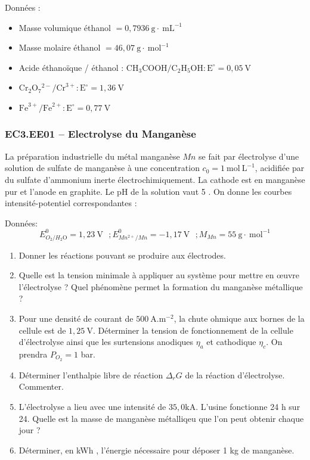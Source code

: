 Données :
\begin{itemize}
\item Masse volumique éthanol $=0,7936 \mathrm{~g} \cdot \mathrm{~mL}^{-1}$
\item Masse molaire éthanol $=46,07 \mathrm{~g} \cdot \mathrm{~mol}^{-1}$
\item Acide éthanoïque / éthanol : $\mathrm{CH}_3 \mathrm{COOH} / \mathrm{C}_2 \mathrm{H}_5 \mathrm{OH}: \mathrm{E}^{\circ}=0,05 \mathrm{~V}$
\item $\mathrm{Cr}_2 \mathrm{O}_7{ }^{2-} / \mathrm{Cr}^{3+}: \mathrm{E}^{\circ}=1,36 \mathrm{~V}$
\item $\mathrm{Fe}^{3+} / \mathrm{Fe}^{2+}: \mathrm{E}^{\circ}=0,77 \mathrm{~V}$

\end{itemize}

\newpage
\subsubsection*{EC3.EE01 -- Electrolyse du Manganèse  \corrige}

La préparation industrielle du métal manganèse $M n$ se fait par électrolyse d'une solution de sulfate de manganèse à une concentration $c_0=1 \mathrm{~mol} \mathrm{~L}^{-1}$, acidifiée par du sulfate d'ammonium inerte électrochimiquement. La cathode est en manganèse pur et l'anode en graphite. Le pH de la solution vaut 5 . On donne les courbes intensité-potentiel correspondantes :
\begin{center}
\end{center}
Données:
$$
E_{O_2 / H_2 \mathrm{O}}^0=1,23 \mathrm{~V}  \text{ } ; E_{M n^{2+} / M n}^0=-1,17 \mathrm{~V} \text{ } ; M_{M n}=55 \mathrm{~g} \cdot \mathrm{~mol}^{-1}
$$
\begin{enumerate}
\item Donner les réactions pouvant se produire aux électrodes.
\item Quelle est la tension minimale à appliquer au système pour mettre en œuvre l'électrolyse ? Quel phénomène permet la formation du manganèse métallique ?
\item Pour une densité de courant de $500 \mathrm{~A} . \mathrm{m}^{-2}$, la chute ohmique aux bornes de la cellule est de $1,25 \mathrm{~V}$. Déterminer la tension de fonctionnement de la cellule d'électrolyse ainsi que les surtensions anodiques $\eta_a$ et cathodique $\eta_c$. On prendra $P_{O_2}=1$ bar.
\item Déterminer l'enthalpie libre de réaction $\Delta_r G$ de la réaction d'électrolyse. Commenter.
\item L'électrolyse a lieu avec une intensité de $35,0 \mathrm{kA}$. L'usine fonctionne 24 h sur 24. Quelle est la masse de manganèse métalliqeu que l'on peut obtenir chaque jour ?
\item Déterminer, en kWh , l'énergie nécessaire pour déposer 1 kg de manganèse.
\end{enumerate}


